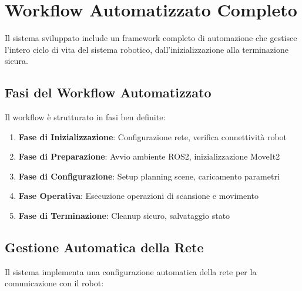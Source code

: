 \documentclass[12pt,a4paper,twoside,openright]{book}
\begin{document}
\section{Workflow Automatizzato Completo}

Il sistema sviluppato include un framework completo di automazione che gestisce l'intero ciclo di vita del sistema robotico, dall'inizializzazione alla terminazione sicura.

\subsection{Fasi del Workflow Automatizzato}

Il workflow è strutturato in fasi ben definite:

\begin{enumerate}
    \item \textbf{Fase di Inizializzazione}: Configurazione rete, verifica connettività robot
    \item \textbf{Fase di Preparazione}: Avvio ambiente ROS2, inizializzazione MoveIt2
    \item \textbf{Fase di Configurazione}: Setup planning scene, caricamento parametri
    \item \textbf{Fase Operativa}: Esecuzione operazioni di scansione e movimento
    \item \textbf{Fase di Terminazione}: Cleanup sicuro, salvataggio stato
\end{enumerate}

\subsection{Gestione Automatica della Rete}

Il sistema implementa una configurazione automatica della rete per la comunicazione con il robot:
\end{document}
